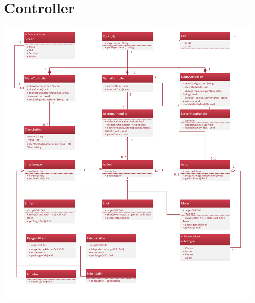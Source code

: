 \section{Controller}
\begin{center}
	\includegraphics[width=18cm]{images/Klassendiagram_Controller}
\end{center}

